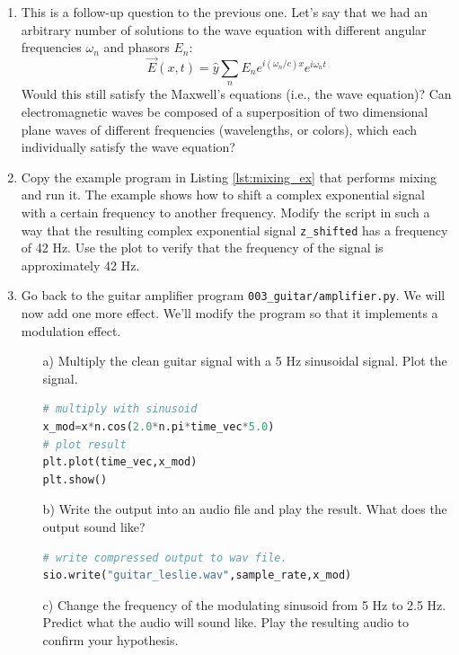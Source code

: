 \begin{enumerate}
\item This is a follow-up question to the previous one. Let's say that we had an arbitrary number of solutions to the wave equation with different angular frequencies $\omega_n$ and phasors $E_n$:
\begin{equation}
    \vec{E}(x,t) = \hat{y}\sum_n E_n e^{i (\omega_n/c) x} e^{i \omega_n t}
\end{equation}
Would this still satisfy the Maxwell's equations (i.e., the wave equation)? Can electromagnetic waves be composed of a superposition of two dimensional plane waves of different frequencies (wavelengths, or colors), which each individually satisfy the wave equation?


\item Copy the example program in Listing \ref{lst:mixing_ex} that performs mixing and run it. The example shows how to shift a complex exponential signal with a certain frequency to another frequency. Modify the script in such a way that the resulting complex exponential signal \verb|z_shifted| has a frequency of 42 Hz. Use the plot to verify that the frequency of the signal is approximately 42 Hz.


\item Go back to the guitar amplifier program
  \texttt{003\_guitar/amplifier.py}. We will now add one more
  effect. We'll modify the program so that it implements a modulation effect.

\begin{itemize}
\item[a)] Multiply the clean guitar signal with a 5 Hz sinusoidal signal. Plot the signal.
\begin{lstlisting}[language=Python]
# multiply with sinusoid
x_mod=x*n.cos(2.0*n.pi*time_vec*5.0)
# plot result
plt.plot(time_vec,x_mod)
plt.show()
\end{lstlisting}
\item[b)] Write the output into an audio file and play the
  result. What does the output sound like? 
\begin{lstlisting}[language=Python]
# write compressed output to wav file. 
sio.write("guitar_leslie.wav",sample_rate,x_mod)
\end{lstlisting}

\item[c)] Change the frequency of the modulating sinusoid from 5 Hz to 2.5 Hz. Predict what the audio will sound like. Play the resulting audio to confirm your hypothesis.


\end{itemize}
\end{enumerate}
